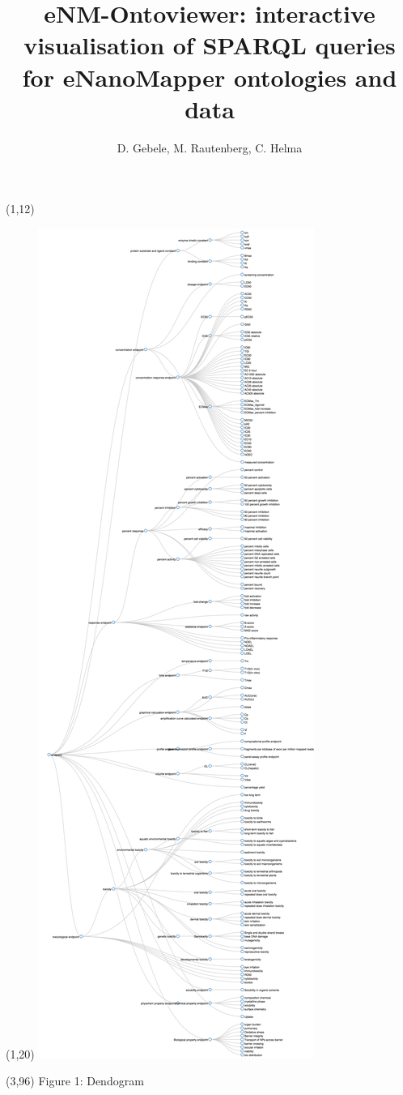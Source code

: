 \documentclass[final]{beamer}
\title{eNM-Ontoviewer: interactive visualisation of SPARQL queries for eNanoMapper ontologies and data}
\author{D. Gebele, M. Rautenberg, C. Helma}
\institute{\emph{in silico} toxicology gmbh, Basel, Switzerland}
\begin{document}
  \begin{frame}{}

    \begin{textblock}{81.5}(1,12)
      \justifying
      
    \end{textblock}
    
    \begin{textblock}{30}(1,20)
      \includegraphics[scale=0.35,trim={20cm 0 0 0},clip]{onto-viewer-dendogram-1.png}
    \end{textblock}
    \begin{textblock}{40}(3,96)
      \small Figure 1: Dendogram
    \end{textblock}
    

\end{frame}
\end{document}
